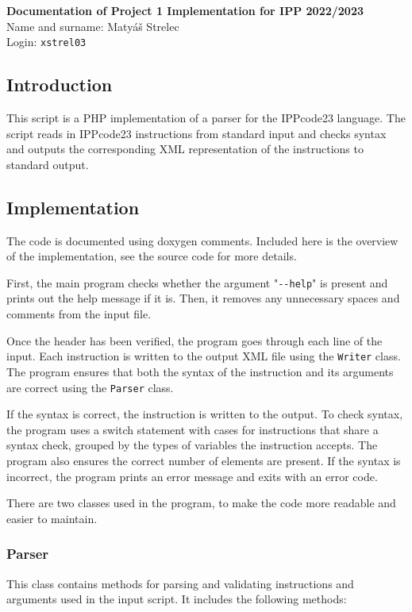 \documentclass[11pt,a4paper]{article}
\begin{document}
    \noindent
    \Large{\textbf{Documentation of Project 1 Implementation for IPP 2022/2023}}
    \normalsize \\
    Name and surname: Matyáš Strelec \\
    Login: \verb|xstrel03|

\subsection*{Introduction}

This script is a PHP implementation of a parser for the IPPcode23 language. The script reads in IPPcode23 instructions from standard input and checks syntax and outputs the corresponding XML representation of the instructions to standard output.

\subsection*{Implementation}

The code is documented using doxygen comments. Included here is the overview of the implementation, see the source code for more details.

First, the main program checks whether the argument "\verb|--help|" is present and prints out the help message if it is. Then, it removes any unnecessary spaces and comments from the input file.

Once the header has been verified, the program goes through each line of the input. Each instruction is written to the output XML file using the \verb|Writer| class. The program ensures that both the syntax of the instruction and its arguments are correct using the \verb|Parser| class.

If the syntax is correct, the instruction is written to the output. To check syntax, the program uses a switch statement with cases for instructions that share a syntax check, grouped by the types of variables the instruction accepts. The program also ensures the correct number of elements are present. If the syntax is incorrect, the program prints an error message and exits with an error code.

There are two classes used in the program, to make the code more readable and easier to maintain.

\subsubsection*{Parser}

This class contains methods for parsing and validating instructions and arguments used in the input script. It includes the following methods:
\end{document}
